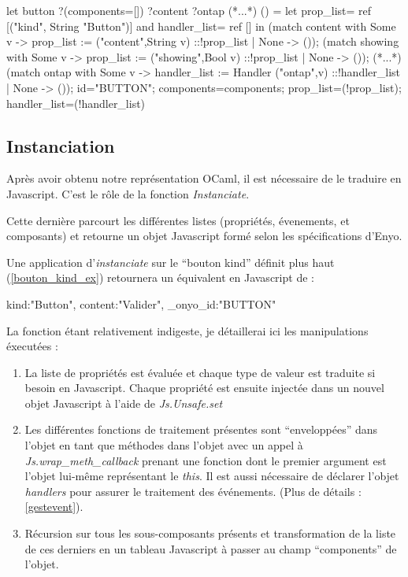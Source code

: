 \documentclass[11pt,a4paper]{report}
\begin{document}
\begin{OCaml}
  let button
      ?(components=[])
      ?content
      ?ontap
      (*...*)
      () =
    let prop_list= ref [("kind", String "Button")]
    and handler_list= ref [] in
    (match content with 
        Some v -> prop_list := ("content",String v)
                               ::!prop_list 
        | None -> ());
    (match showing with 
        Some v -> prop_list := ("showing",Bool v)
                               ::!prop_list 
        | None -> ());
    (*...*)
    (match ontap with 
        Some v -> handler_list := Handler ("ontap",v)
                                  ::!handler_list 
        | None -> ());
    {id="BUTTON"; 
     components=components;
     prop_list=(!prop_list);
     handler_list=(!handler_list)}
\end{OCaml}

\subsection{Instanciation}

Après avoir obtenu notre représentation OCaml, il est nécessaire de le traduire en Javascript.
C'est le rôle de la fonction \emph{Instanciate}.

Cette dernière parcourt les différentes listes (propriétés, évenements, et composants) et retourne
un objet Javascript formé selon les spécifications d'Enyo.

Une application d'\emph{instanciate} sur le ``bouton kind'' définit plus haut (\ref{bouton_kind_ex}) 
retournera un équivalent en Javascript de :

\begin{JavaScript}
  {kind:"Button", content:"Valider", _onyo_id:"BUTTON"}
\end{JavaScript}

La fonction étant relativement indigeste, je détaillerai ici les manipulations éxecutées :

\begin{enumerate}
\item La liste de propriétés est évaluée et chaque type de valeur est traduite si besoin en Javascript.
  Chaque propriété est ensuite injectée dans un nouvel objet Javascript à l'aide de \emph{Js.Unsafe.set}
\item \label{wrap_meth} 
  Les différentes fonctions de traitement présentes sont ``enveloppées'' dans l'objet en tant que méthodes
  dans l'objet avec un appel à \\\emph{Js.wrap\_meth\_callback} prenant une fonction dont le premier argument
  est l'objet lui-même représentant le \emph{this}. Il est aussi nécessaire de déclarer l'objet
  \emph{handlers} pour assurer le traitement des événements.
  (Plus de détails : \ref{gestevent}).
\item Récursion sur tous les sous-composants présents et transformation de la liste de ces derniers en 
  un tableau Javascript à passer au champ ``components'' de l'objet.
\end{enumerate}
\end{document}
